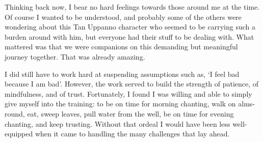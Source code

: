 Thinking back now, I bear no hard feelings towards those around me at
the time. Of course I wanted to be understood, and probably some of the
others were wondering about this Tan Uppanno character who seemed to be
carrying such a burden around with him, but everyone had their stuff to
be dealing with. What mattered was that we were companions on this
demanding but meaningful journey together. That was already amazing.

I did still have to work hard at suspending assumptions such as, `I feel
bad because I am bad'. However, the work served to build the strength of
patience, of mindfulness, and of trust. Fortunately, I found I was
willing and able to simply give myself into the training: to be on time
for morning chanting, walk on alms-round, eat, sweep leaves, pull water
from the well, be on time for evening chanting, and keep trusting.
Without that ordeal I would have been less well-equipped when it came to
handling the many challenges that lay ahead.

